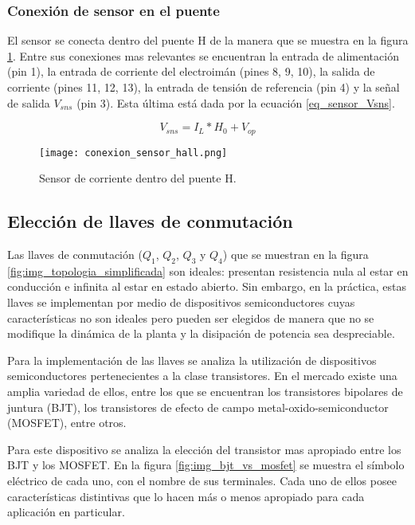 \subsubsection{Conexión de sensor en el puente}

El sensor se conecta dentro del puente H de la manera que se muestra en la figura \ref{fig:img_conexion_sensor}. Entre sus conexiones mas relevantes se encuentran la entrada de alimentación (pin 1), la entrada de corriente del electroimán (pines 8, 9, 10), la salida de corriente (pines 11, 12, 13), la entrada de tensión de referencia (pin 4) y la señal de salida $V_{sns}$ (pin 3). Esta última está dada por la ecuación \ref{eq_sensor_Vsns}.

\begin{equation}\label{eq_sensor_Vsns}
	V_{sns}=I_L*H_0+V_{op}
\end{equation}

\begin{figure}[H]
	\centering
	\texttt{[image: conexion\_sensor\_hall.png]}
	\caption{Sensor de corriente dentro del puente H.}
	\label{fig:img_conexion_sensor}
\end{figure}



\subsection{Elección de llaves de conmutación} \label{sec_eleccion_llaves}

Las llaves de conmutación ($Q_1$, $Q_2$, $Q_3$ y $Q_4$) que se muestran en la figura \ref{fig:img_topologia_simplificada} son ideales: presentan resistencia nula al estar en conducción e infinita al estar en estado abierto. Sin embargo, en la práctica, estas llaves se implementan por medio de dispositivos semiconductores cuyas características no son ideales pero pueden ser elegidos de manera que no se modifique la dinámica de la planta y la disipación de potencia sea despreciable.

Para la implementación de las llaves se analiza la utilización de dispositivos semiconductores pertenecientes a la clase transistores. En el mercado existe una amplia variedad de ellos, entre los que se encuentran los transistores bipolares de juntura (BJT), los transistores de efecto de campo metal-oxido-semiconductor (MOSFET), entre otros. 

Para este dispositivo se analiza la elección del transistor mas apropiado entre los BJT y los MOSFET. En la figura \ref{fig:img_bjt_vs_mosfet} se muestra el símbolo eléctrico de cada uno, con el nombre de sus terminales. Cada uno de ellos posee características distintivas que lo hacen más o menos apropiado para cada aplicación en particular. 

